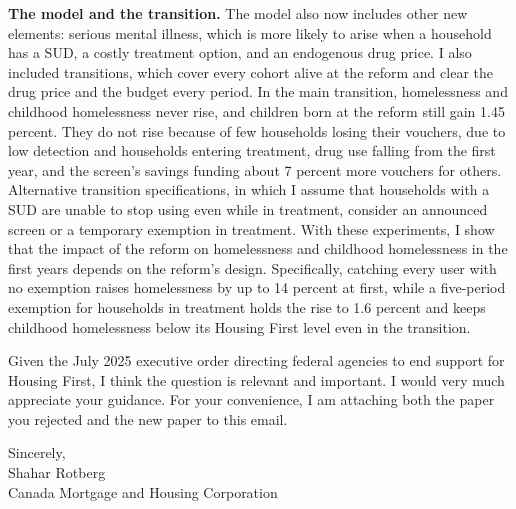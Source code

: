 \documentclass[10pt]{article}
\begin{document}
\textbf{The model and the transition.} The model also now includes other new elements: serious mental illness, which is more likely to arise when a household has a SUD, a costly treatment option, and an endogenous drug price. I also included transitions, which cover every cohort alive at the reform and clear the drug price and the budget every period. In the main transition, homelessness and childhood homelessness never rise, and children born at the reform still gain 1.45 percent. They do not rise because of few households losing their vouchers, due to low detection and households entering treatment, drug use falling from the first year, and the screen's savings funding about 7 percent more vouchers for others. Alternative transition specifications, in which I assume that households with a SUD are unable to stop using even while in treatment, consider an announced screen or a temporary exemption in treatment. With these experiments, I show that the impact of the reform on homelessness and childhood homelessness in the first years depends on the reform's design. Specifically, catching every user with no exemption raises homelessness by up to 14 percent at first, while a five-period exemption for households in treatment holds the rise to 1.6 percent and keeps childhood homelessness below its Housing First level even in the transition.

Given the July 2025 executive order directing federal agencies to end support for Housing First, I think the question is relevant and important. I would very much appreciate your guidance. For your convenience, I am attaching both the paper you rejected and the new paper to this email.

Sincerely,\\
Shahar Rotberg\\
Canada Mortgage and Housing Corporation
\end{document}
